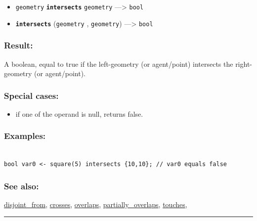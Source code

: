 \documentclass[]{book}
\providecommand{\tightlist}{%
  \setlength{\itemsep}{0pt}\setlength{\parskip}{0pt}}
\theoremstyle{definition}
\theoremstyle{definition}
\theoremstyle{definition}
\theoremstyle{remark}
\begin{document}
\begin{itemize}
\tightlist
\item
  \texttt{geometry} \textbf{\texttt{intersects}} \texttt{geometry}
  ---\textgreater{} \texttt{bool}
\item
  \textbf{\texttt{intersects}} (\texttt{geometry} , \texttt{geometry})
  ---\textgreater{} \texttt{bool}
\end{itemize}

\subsubsection{Result:}\label{result-272}

A boolean, equal to true if the left-geometry (or agent/point)
intersects the right-geometry (or agent/point).

\subsubsection{Special cases:}\label{special-cases-81}

\begin{itemize}
\tightlist
\item
  if one of the operand is null, returns false.
\end{itemize}

\subsubsection{Examples:}\label{examples-212}

\begin{verbatim}
 
bool var0 <- square(5) intersects {10,10}; // var0 equals false
\end{verbatim}

\subsubsection{See also:}\label{see-also-121}

\href{operators-d-to-h.html\#disjoint_from}{disjoint\_from},
\href{operators-b-to-c.html\#crosses}{crosses},
\href{operators-n-to-r.html\#overlaps}{overlaps},
\href{operators-n-to-r.html\#partially_overlaps}{partially\_overlaps},
\href{operators-s-to-z.html\#touches}{touches},

\begin{center}\rule{0.5\linewidth}{\linethickness}\end{center}
\end{document}
